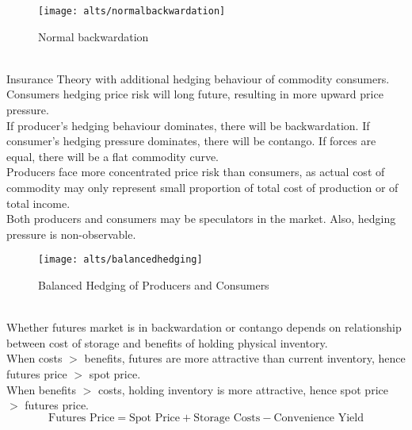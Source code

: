 \begin{figure}[H]
\centering
\texttt{[image: alts/normalbackwardation]}
\caption{Normal backwardation}
\end{figure}

\begin{remark} \\
Insurance Theory with additional hedging behaviour of commodity consumers.\\
Consumers hedging price risk will long future, resulting in more upward price pressure.\\
If producer's hedging behaviour dominates, there will be backwardation. If consumer's hedging pressure dominates, there will be contango. If forces are equal, there will be a flat commodity curve.\\
Producers face more concentrated price risk than consumers, as actual cost of commodity may only represent small proportion of total cost of production or of total income.\\
Both producers and consumers may be speculators in the market. Also, hedging pressure is non-observable.
\end{remark}

\begin{figure}[H]
\centering
\texttt{[image: alts/balancedhedging]}
\caption{Balanced Hedging of Producers and Consumers}
\end{figure}

\begin{remark} \\
Whether futures market is in backwardation or contango depends on relationship between cost of storage and benefits of holding physical inventory.\\
When costs $>$ benefits, futures are more attractive than current inventory, hence futures price $>$ spot price.\\
When benefits $>$ costs, holding inventory is more attractive, hence spot price $>$ futures price.
\begin{equation}
\text{Futures Price} = \text{Spot Price} + \text{Storage Costs} - \text{Convenience Yield} \nonumber
\end{equation}
\end{remark}

